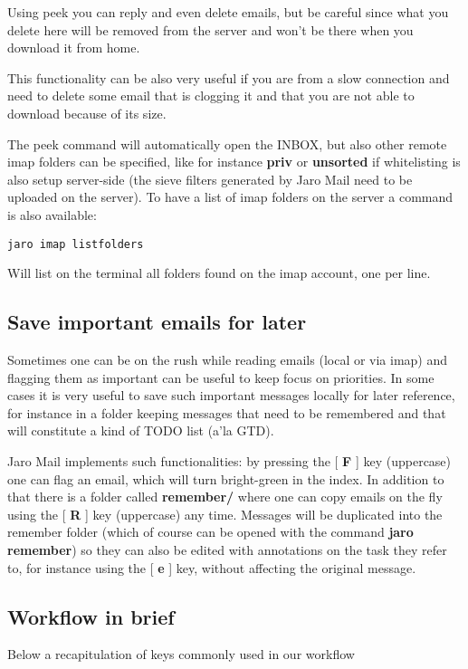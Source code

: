 \documentclass[a4,onecolumn,portrait]{article}
\begin{document}
Using peek you can reply and even delete emails, but be careful since what you delete here will be removed from the server and won't be
there when you download it from home.

This functionality can be also very useful if you are from a slow connection and need to delete some email that is clogging it and that you are not able to download because of its size.

The peek command will automatically open the INBOX, but also other remote imap folders can be specified, like for instance \textbf{priv} or \textbf{unsorted} if whitelisting is also setup server-side (the sieve filters generated by Jaro Mail need to be uploaded on the server). To have a list of imap folders on the server a command is also available:

\begin{verbatim}
jaro imap listfolders
\end{verbatim}

Will list on the terminal all folders found on the imap account, one per line.
\subsection{Save important emails for later}
\label{sec-6-6}

Sometimes one can be on the rush while reading emails (local or via imap) and flagging them as important can be useful to keep focus on
priorities. In some cases it is very useful to save such important messages locally for later reference, for instance in a folder keeping messages that need to be remembered and that will constitute a kind of TODO list (a'la GTD).

Jaro Mail implements such functionalities: by pressing the [ \textbf{F} ] key (uppercase) one can flag an email, which will turn bright-green in the
index. In addition to that there is a folder called \textbf{remember/} where one can copy emails on the fly using the [ \textbf{R} ] key (uppercase) any time. Messages will be duplicated into the remember folder (which of course can be opened with the command \textbf{jaro remember}) so they can
also be edited with annotations on the task they refer to, for instance using the [ \textbf{e} ] key, without affecting the original message.
\subsection{Workflow in brief}
\label{sec-6-7}

Below a recapitulation of keys commonly used in our workflow
\end{document}
